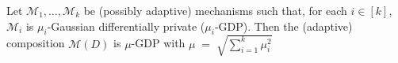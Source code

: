Let $\mathcal{M}_1,\ldots,\mathcal{M}_k$ be (possibly adaptive) mechanisms such that, for each $i\in[k]$, $\mathcal{M}_i$ is $\mu_i$-Gaussian differentially private ($\mu_i$-GDP). Then the (adaptive) composition $\mathcal{M}(D)$ is $\mu$-GDP with $\mu \;=\; \sqrt{\sum_{i=1}^k \mu_i^2}$